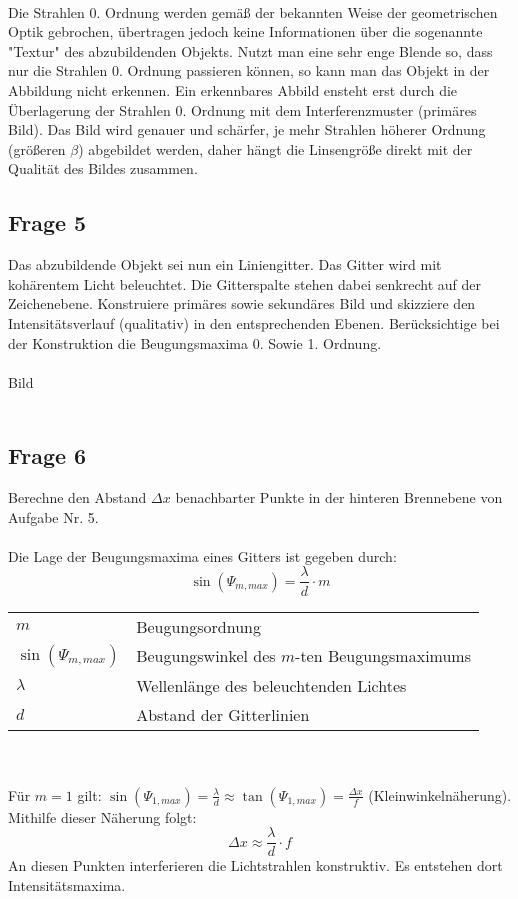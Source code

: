 \documentclass[a4paper,10pt]{scrartcl}
\begin{document}
			\\
			Die Strahlen 0. Ordnung werden gemäß der bekannten Weise der geometrischen Optik gebrochen, übertragen jedoch keine Informationen über die sogenannte "Textur" des abzubildenden Objekts. Nutzt man eine sehr enge Blende so, dass nur die Strahlen 0. Ordnung passieren können, so kann man das Objekt in der Abbildung nicht erkennen. Ein erkennbares Abbild ensteht erst durch die Überlagerung der Strahlen 0. Ordnung mit dem Interferenzmuster (primäres Bild). Das Bild wird genauer und schärfer, je mehr Strahlen höherer Ordnung 
			(größeren \(\beta\)) abgebildet werden, daher hängt die Linsengröße direkt mit der Qualität des Bildes zusammen.
			
			\subsection{Frage 5}
		Das abzubildende Objekt sei nun ein Liniengitter. Das Gitter wird mit kohärentem Licht beleuchtet. Die Gitterspalte stehen dabei senkrecht auf der Zeichenebene. Konstruiere primäres sowie sekundäres Bild und skizziere den Intensitätsverlauf (qualitativ) in den entsprechenden Ebenen. Berücksichtige bei der Konstruktion die Beugungsmaxima 0. Sowie 1. Ordnung.
		\\
		\\
		Bild
		\\
		\\
	\subsection{Frage 6}
		Berechne den Abstand $\Delta x$ benachbarter Punkte in der hinteren Brennebene von\\Aufgabe Nr. 5.
		\\
		\\
		Die Lage der Beugungsmaxima eines Gitters ist gegeben durch:
			\[\sin(\Psi_{m,max}) = \frac{\lambda}{d} \cdot m\]
		\begin{tabular}{ll}
			$m$ & Beugungsordnung\\
			$\sin(\Psi_{m,max})$ & Beugungswinkel des $m$-ten Beugungsmaximums\\
			$\lambda$ & Wellenlänge des beleuchtenden Lichtes\\
			$d$ & Abstand der Gitterlinien
		\end{tabular}
		\\
		\\
		Für $m = 1$ gilt: $\sin(\Psi_{1,max}) = \frac{\lambda}{d} \approx \tan(\Psi_{1,max}) = \frac{\Delta x}{f}$ (Kleinwinkelnäherung).\\
		Mithilfe dieser Näherung folgt:
			\[\Delta x \approx \frac{\lambda}{d} \cdot f\]
		An diesen Punkten interferieren die Lichtstrahlen konstruktiv. Es entstehen dort Intensitätsmaxima.
\end{document}
